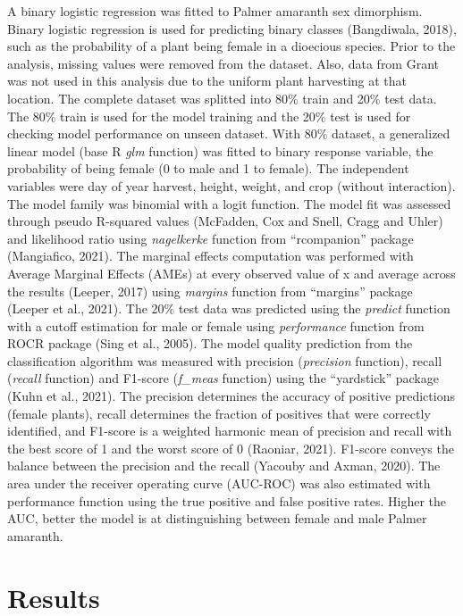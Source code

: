 \documentclass[utf8]{frontiersSCNS}
\begin{document}
A binary logistic regression was fitted to Palmer amaranth sex
dimorphism. Binary logistic regression is used for predicting binary
classes (Bangdiwala, 2018), such as the probability of a plant being
female in a dioecious species. Prior to the analysis, missing values
were removed from the dataset. Also, data from Grant was not used in
this analysis due to the uniform plant harvesting at that location. The
complete dataset was splitted into 80\% train and 20\% test data. The
80\% train is used for the model training and the 20\% test is used for
checking model performance on unseen dataset. With 80\% dataset, a
generalized linear model (base R \emph{glm} function) was fitted to
binary response variable, the probability of being female (0 to male and
1 to female). The independent variables were day of year harvest,
height, weight, and crop (without interaction). The model family was
binomial with a logit function. The model fit was assessed through
pseudo R-squared values (McFadden, Cox and Snell, Cragg and Uhler) and
likelihood ratio using \emph{nagelkerke} function from ``rcompanion''
package (Mangiafico, 2021). The marginal effects computation was
performed with Average Marginal Effects (AMEs) at every observed value
of x and average across the results (Leeper, 2017) using \emph{margins}
function from ``margins'' package (Leeper et al., 2021). The 20\% test
data was predicted using the \emph{predict} function with a cutoff
estimation for male or female using \emph{performance} function from
ROCR package (Sing et al., 2005). The model quality prediction from the
classification algorithm was measured with precision (\emph{precision}
function), recall (\emph{recall} function) and F1-score (\emph{f\_meas}
function) using the ``yardstick'' package (Kuhn et al., 2021). The
precision determines the accuracy of positive predictions (female
plants), recall determines the fraction of positives that were correctly
identified, and F1-score is a weighted harmonic mean of precision and
recall with the best score of 1 and the worst score of 0 (Raoniar,
2021). F1-score conveys the balance between the precision and the recall
(Yacouby and Axman, 2020). The area under the receiver operating curve
(AUC-ROC) was also estimated with performance function using the true
positive and false positive rates. Higher the AUC, better the model is
at distinguishing between female and male Palmer amaranth.

\hypertarget{results}{%
\section*{Results}\label{results}}
\end{document}
